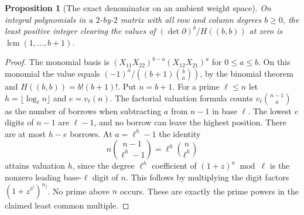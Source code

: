 \documentclass[a4paper,11pt]{article}
\newtheorem{proposition}{Proposition}[section]
\theoremstyle{definition}
\theoremstyle{remark}
\numberwithin{equation}{section}
\begin{document}
\begin{proposition}[The exact denominator on an ambient weight space]
\label{prop:lcm86}
On integral polynomials in a \(2\)-by-\(2\) matrix with all row
and column degrees \(b\ge0\), the least positive integer clearing
the values of \((\det\partial)^b/H((b,b))\) at zero is
\(\operatorname{lcm}(1,\ldots,b+1)\).
\end{proposition}
\begin{proof}
The monomial basis is \((X_{11}X_{22})^{b-a}(X_{12}X_{21})^a\)
for \(0\le a\le b\). On this monomial the value equals
\((-1)^a/((b+1)\binom ba)\), by the binomial theorem and
\(H((b,b))=b!(b+1)!\). Put \(n=b+1\). For a prime \(\ell\le n\)
let \(h=\lfloor\log_\ell n\rfloor\) and \(e=v_\ell(n)\).
The factorial valuation formula counts \(v_\ell\binom{n-1}{a}\)
as the number of borrows when subtracting \(a\) from \(n-1\)
in base \(\ell\). The lowest \(e\) digits of \(n-1\) are
\(\ell-1\), and no borrow can leave the highest position.
There are at most \(h-e\) borrows. At \(a=\ell^h-1\) the identity
\[
    n\binom{n-1}{\ell^h-1}=\ell^h\binom n{\ell^h}
\]
attains valuation \(h\), since the degree \(\ell^h\) coefficient
of \((1+z)^n\bmod\ell\) is the nonzero leading base-\(\ell\)
digit of \(n\). This follows by multiplying the digit factors
\((1+z^{\ell^j})^{n_j}\). No prime above \(n\) occurs. These
are exactly the prime powers in the claimed least common multiple.
\end{proof}
\end{document}
